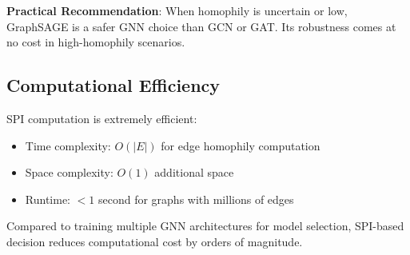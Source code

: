\textbf{Practical Recommendation}: When homophily is uncertain or low, GraphSAGE is a safer GNN choice than GCN or GAT. Its robustness comes at no cost in high-homophily scenarios.

\subsection{Computational Efficiency}

SPI computation is extremely efficient:
\begin{itemize}
    \item Time complexity: $O(|E|)$ for edge homophily computation
    \item Space complexity: $O(1)$ additional space
    \item Runtime: $<1$ second for graphs with millions of edges
\end{itemize}

Compared to training multiple GNN architectures for model selection, SPI-based decision reduces computational cost by orders of magnitude.
